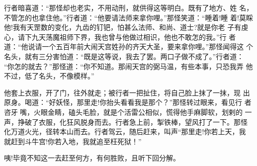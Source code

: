 行者暗喜道：“那怪却也老实，不用动刑，就供得这等明白。既有了地方、姓
名，不管怎的也拿住他。”行者道：“他要请法师来拿你哩。”那怪笑道：“睡着!睡
着!莫睬他!我有天罡数的变化，九齿的钉钯，怕甚么法师、和尚、道士?就是你老
子有虔心，请下九天荡魔祖师下界，我也曾与他做过相识，他也不敢怎的我。”行
者道：“他说请一个五百年前大闹天宫姓孙的齐天大圣，要来拿你哩。”那怪闻得这
个名头，就有三分害怕道：“既是这等说，我去了罢。两口子做不成了。”行者道：
“你怎的就去？”那怪道：“你不知道。那闹天宫的弼马温，有些本事，只恐我弄
他不过，低了名头，不像模样。”

他套上衣服，开了门，往外就走；被行者一把扯住，将自己脸上抹了一抹，现
出原身。喝道：“好妖怪，那里走!你抬头看看我是那个？”那怪转过眼来，看见行
者咨牙嘴，火眼金睛，磕头毛脸，就是个活雷公相似，慌得他手麻脚软，划剌的
一声，挣破了衣服，化狂风脱身而去。行者急上前，掣铁棒，望风打了一下。那怪
化万道火光，径转本山而去。行者驾云，随后赶来，叫声“那里走!你若上天，我
就赶到斗牛宫!你若入地，我就追至枉死狱！”

咦!毕竟不知这一去赶至何方，有何胜败，且听下回分解。